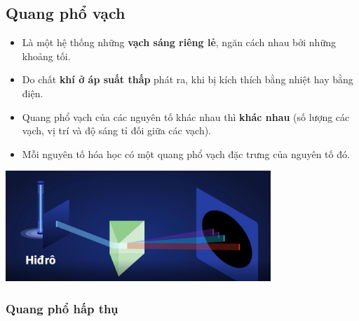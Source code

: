 \subsection{Quang phổ vạch}
	
	\begin{itemize}

 		\item Là một hệ thống những \textbf{vạch sáng riêng lẻ}, ngăn cách nhau bởi những khoảng tối.

 		\item Do chất \textbf{khí ở áp suất thấp} phát ra, khi bị kích thích bằng nhiệt hay bằng điện.

 		\item Quang phổ vạch của các nguyên tố khác nhau thì \textbf{khác nhau} (số lượng các vạch, vị trí và độ sáng tỉ đối giữa các vạch).

 		\item Mỗi nguyên tố hóa học có một quang phổ vạch đặc trưng của nguyên tố đó.
 	
 	\end{itemize}
 
 \begin{center}
 	\includegraphics[width=10cm]{../figs/VN12-PH-36-L-021-2-2.JPG}
 \end{center}

	\subsubsection{Quang phổ hấp thụ}
	
